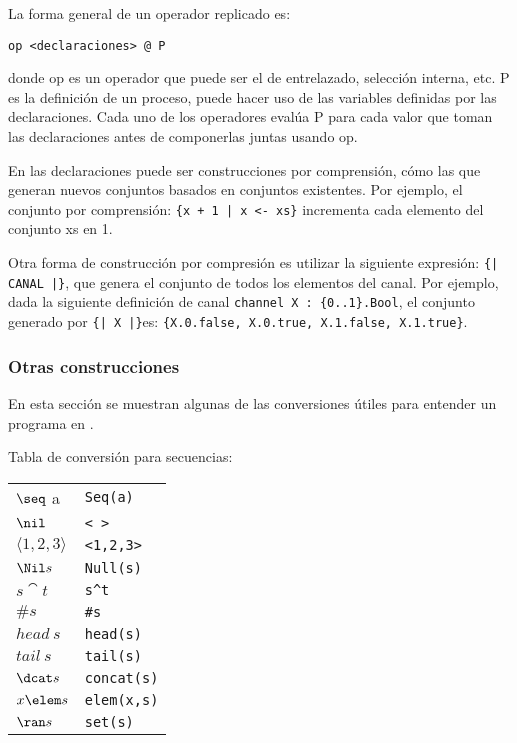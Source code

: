 La forma general de un operador replicado es:

\begin{verbatim}
op <declaraciones> @ P
\end{verbatim}

donde op es un operador que puede ser el de entrelazado, selección interna, etc. P es la definición de un proceso, puede hacer uso de las variables definidas por las declaraciones. Cada uno de los operadores evalúa P para cada valor que toman las declaraciones antes de componerlas juntas usando op.

En \CSPm las declaraciones puede ser construcciones por comprensión, cómo las que generan nuevos conjuntos basados en conjuntos existentes. Por ejemplo, el conjunto por comprensión: \verb={x + 1 | x <- xs}= incrementa cada elemento del conjunto xs en 1. 

Otra forma de construcción por compresión es utilizar la siguiente expresión: \verb={| CANAL |}=, que genera el conjunto de todos los elementos del canal. Por ejemplo, dada la siguiente definición de canal \verb=channel X : {0..1}.Bool=, el conjunto generado por \verb={| X |}=es: \verb={X.0.false, X.0.true, X.1.false, X.1.true}=.



\subsubsection{Otras construcciones}
En esta sección se muestran algunas de las conversiones útiles para entender un programa en \CSPm.

Tabla de conversión para secuencias:

\begin{center}
\begin{tabular}{ l l }
  $\seq$ a & \verb|Seq(a)| \\
  $\nil$ & \verb|< >| \\
  $\langle 1, 2, 3 \rangle$ & \verb|<1,2,3>| \\
  $\Nil s$ & \verb=Null(s)=
  \\
  $s \cat t$ & \verb=s^t=
  \\
  $\# s$ & \verb|#s|
  \\
  $head~s$ & \verb|head(s)|
  \\
  $tail~s$ & \verb|tail(s)|
  \\
  $\dcat s$ & \verb|concat(s)|
  \\
  $x \elem s$ & \verb=elem(x,s)=
  \\
  $\ran s$ &  \verb|set(s)|
  
\end{tabular}
\end{center}

